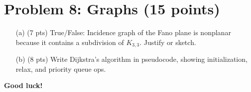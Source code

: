 \documentclass[12pt]{article}
\begin{document}
\section*{Problem 8: Graphs (15 points)}
\begin{enumerate}
  \item[(a)] (7 pts) True/False: Incidence graph of the Fano plane is nonplanar because it contains a subdivision of \(K_{3,3}\). Justify or sketch.
  \item[(b)] (8 pts) Write Dijkstra’s algorithm in pseudocode, showing initialization, relax, and priority queue ops.
\end{enumerate}

\vfill
\noindent\textbf{Good luck!}
\end{document}
